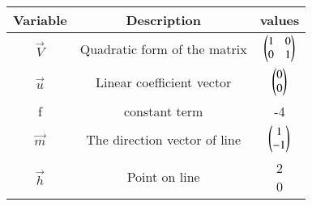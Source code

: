 \begin{tabular}[12pt]{ |c| c| c |}
    \hline
    \textbf{Variable} & \textbf{Description} & \textbf{values}\\ 
    \hline
    $\vec{V}$ & Quadratic form of the matrix & $\begin{pmatrix}1 & 0 \\ 0 & 1\end{pmatrix} $\\
    \hline
    $\vec{u}$ & Linear coefficient vector & $\begin{pmatrix}0 \\ 0\end{pmatrix} $\\
    \hline
    f & constant term & -4 \\ 
    \hline
    $\vec{m}$ & The direction vector of line & $\begin{pmatrix}1 \\ -1\end{pmatrix}$\\
    \hline
     $\vec{h}$ & Point on line & \myvec{2 \\ 0} \\
     \hline
\end{tabular}
